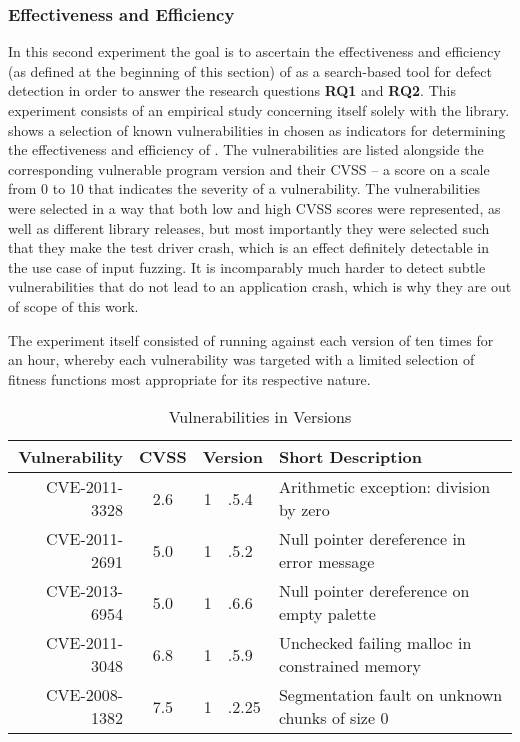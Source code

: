 \subsubsection{Effectiveness and Efficiency}
In this second experiment the goal is to ascertain the effectiveness and efficiency (as defined at the
beginning of this section) of \xmlmate as a search-based tool for defect detection in order to answer the
research questions \textbf{RQ1} and \textbf{RQ2}. This experiment consists of
an empirical study concerning itself solely with the \libpng library.  shows a selection of known vulnerabilities in \libpng
chosen as indicators for determining the effectiveness and efficiency of \xmlmate. The vulnerabilities are
listed alongside the corresponding vulnerable program version and their CVSS -- a score on a scale from 0 to 10
that indicates the severity of a vulnerability.
The vulnerabilities were selected in a way that both low and high CVSS scores were represented, as well as
different library releases, but most importantly they were selected such that they make the test driver crash,
which is an effect definitely detectable in the use case of input fuzzing. It is incomparably much harder
to detect subtle vulnerabilities that do not lead to an application crash, which is why they are out of scope of
this work.

The experiment itself consisted of running \xmlmate against each version of \libpng ten times for an hour,
whereby each vulnerability was targeted with a limited selection of fitness functions most appropriate for
its respective nature.

\begin{table}[H]
\centering
\begin{tabular}{|r|c|r@{}l|l|}
\hline
Vulnerability & CVSS  & \multicolumn{2}{c|}{Version} & Short Description \\ \hline \hline 
CVE-2011-3328 & 2.6   & 1&.5.4 	& Arithmetic exception: division by zero   \\ \hline  %
CVE-2011-2691 & 5.0   & 1&.5.2	& Null pointer dereference in error message \\ \hline %
CVE-2013-6954 & 5.0   & 1&.6.6  & Null pointer dereference on empty palette \\ \hline %
CVE-2011-3048 & 6.8   & 1&.5.9  & Unchecked failing malloc in constrained memory \\ \hline %
CVE-2008-1382 & 7.5   & 1&.2.25 & Segmentation fault on unknown chunks of size 0\\ \hline %
\end{tabular}
\caption{Vulnerabilities in \libpng Versions}
\label{tbl:png:vulns}
\end{table}

